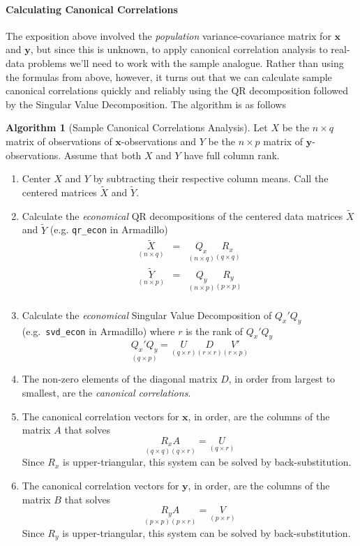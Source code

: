 \documentclass[12pt]{article}
\theoremstyle{definition}
\newtheorem{alg}{Algorithm}[section]
\begin{document}
\paragraph{Calculating Canonical Correlations}
The exposition above involved the \emph{population} variance-covariance matrix for $\mathbf{x}$ and $\mathbf{y}$, but since this is unknown, to apply canonical correlation analysis to real-data problems we'll need to work with the sample analogue. Rather than using the formulas from above, however, it turns out that we can calculate sample canonical correlations quickly and reliably using the QR decomposition followed by the Singular Value Decomposition. The algorithm is as follows
\begin{alg}[Sample Canonical Correlations Analysis]
Let $X$ be the $n\times q$ matrix of observations of $\mathbf{x}$-observations  and $Y$ be the $n\times p$ matrix of $\mathbf{y}$-observations. Assume that both $X$ and $Y$ have full column rank.
   \begin{enumerate}
     \item Center $X$ and $Y$ by subtracting their respective column means. Call the centered matrices $\widetilde{X}$ and $\widetilde{Y}$.
     \item Calculate the \emph{economical} QR decompositions of the centered data matrices $\widetilde{X}$ and $\widetilde{Y}$ (e.g. \texttt{qr\_econ} in Armadillo)
      \begin{eqnarray*}
        \underset{(n\times q)}{\widetilde{X}} &=& \underset{(n\times q)}{Q_x} \underset{(q\times q)}{R_x}\\
        \underset{(n\times p)}{\widetilde{Y}} &=& \underset{(n\times p)}{Q_y} \underset{(p\times p)}{R_y}\\
      \end{eqnarray*}
    \item Calculate the \emph{economical} Singular Value Decomposition of $Q_x'Q_y$ (e.g.\ \texttt{svd\_econ} in Armadillo) where $r$ is the rank of $Q_x'Q_y$
      $$\underset{(q\times p)}{Q_x'Q_y} = \underset{(q\times r)}{U}\underset{(r\times r)}{D}\underset{(r\times p)}{V'}$$
    \item The non-zero elements of the diagonal matrix $D$, in order from largest to smallest, are the \emph{canonical correlations}.
    \item The canonical correlation vectors for $\mathbf{x}$, in order, are the columns of the matrix $A$ that solves
        $$\underset{(q\times q)(q\times r)}{R_xA} = \underset{(q\times r)}{U}$$
    Since $R_x$ is upper-triangular, this system can be solved by back-substitution.
    \item The canonical correlation vectors for $\mathbf{y}$, in order, are the columns of the matrix $B$ that solves
        $$\underset{(p\times p)(p\times r)}{R_y A} = \underset{(p\times r)}{V}$$
    Since $R_y$ is upper-triangular, this system can be solved by back-substitution.
   \end{enumerate}
 \end{alg} 


\end{document}

